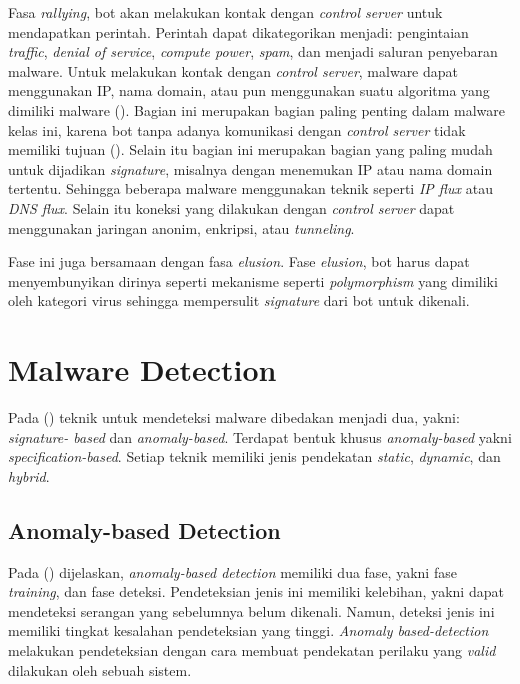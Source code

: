 Fasa \textit{rallying}, bot akan melakukan kontak dengan \textit{control server} untuk mendapatkan perintah. Perintah dapat dikategorikan menjadi: pengintaian \textit{traffic}, \textit{denial of service}, \textit{compute power}, \textit{spam}, dan menjadi saluran penyebaran malware. Untuk melakukan kontak dengan \textit{control server}, malware dapat menggunakan IP, nama domain, atau pun menggunakan suatu algoritma yang dimiliki malware (\cite{alsamer2016}). Bagian ini merupakan bagian paling penting dalam malware kelas ini, karena bot tanpa adanya komunikasi dengan \textit{control server} tidak memiliki tujuan (\cite{alsamer2016}). Selain itu bagian ini merupakan bagian yang paling mudah untuk dijadikan \textit{signature}, misalnya dengan menemukan IP atau nama domain tertentu. Sehingga beberapa malware menggunakan teknik seperti \textit{IP flux} atau \textit{DNS flux}. Selain itu koneksi yang dilakukan dengan \textit{control server} dapat menggunakan jaringan anonim, enkripsi, atau \textit{tunneling}.

Fase ini juga bersamaan dengan fasa \textit{elusion}. Fase \textit{elusion}, bot harus dapat menyembunyikan dirinya seperti mekanisme seperti \textit{polymorphism} yang dimiliki oleh kategori virus sehingga mempersulit \textit{signature} dari bot untuk dikenali. 

\section{Malware Detection}

Pada (\cite{idika2007survey}) teknik untuk mendeteksi malware dibedakan menjadi dua, yakni: \textit{signature-
based} dan \textit{anomaly-based}. Terdapat bentuk khusus \textit{anomaly-based} yakni \textit{specification-based}. Setiap teknik memiliki jenis pendekatan \textit{static}, \textit{dynamic}, dan \textit{hybrid}.

\subsection{Anomaly-based Detection}

Pada (\cite{idika2007survey}) dijelaskan, \textit{anomaly-based detection} memiliki dua fase, yakni fase \textit{training}, dan fase deteksi. Pendeteksian jenis ini memiliki kelebihan, yakni dapat mendeteksi serangan yang sebelumnya belum dikenali. Namun, deteksi jenis ini memiliki tingkat kesalahan pendeteksian yang tinggi. \textit{Anomaly based-detection} melakukan pendeteksian dengan cara membuat pendekatan perilaku yang \textit{valid} dilakukan oleh sebuah sistem.


